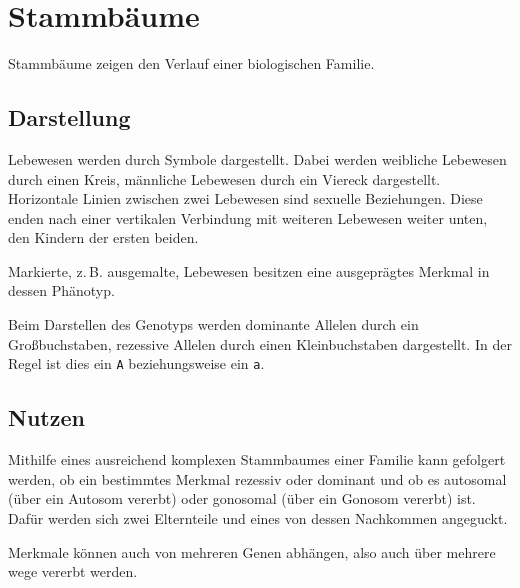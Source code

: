 \documentclass{article}
\begin{document}
\section{Stammbäume}
Stammbäume zeigen den Verlauf einer biologischen Familie.
 
\subsection{Darstellung}
Lebewesen werden durch Symbole dargestellt. Dabei werden weibliche Lebewesen durch einen Kreis, männliche Lebewesen durch ein Viereck dargestellt. Horizontale Linien zwischen zwei Lebewesen sind sexuelle Beziehungen. Diese enden nach einer vertikalen Verbindung mit weiteren Lebewesen weiter unten, den Kindern der ersten beiden.
 
Markierte, z.\,B. ausgemalte, Lebewesen besitzen eine ausgeprägtes Merkmal in dessen Phänotyp.
 
Beim Darstellen des Genotyps werden dominante Allelen durch ein Großbuchstaben, rezessive Allelen durch einen Kleinbuchstaben dargestellt. In der Regel ist dies ein \texttt{A} beziehungsweise ein \texttt{a}.
 
\subsection{Nutzen}
Mithilfe eines ausreichend komplexen Stammbaumes einer Familie kann gefolgert werden, ob ein bestimmtes Merkmal rezessiv oder dominant und ob es autosomal (über ein Autosom vererbt) oder gonosomal (über ein Gonosom vererbt) ist. Dafür werden sich zwei Elternteile und eines von dessen Nachkommen angeguckt.
 
Merkmale können auch von mehreren Genen abhängen, also auch über mehrere wege vererbt werden. 
\end{document}
